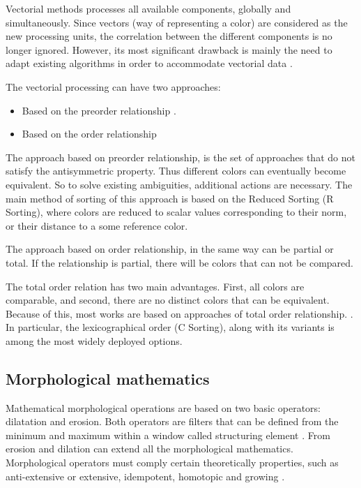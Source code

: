Vectorial methods processes all available components, globally and simultaneously.
Since vectors (way of representing a color) are considered as the new processing units, the correlation between the different components is no longer ignored. However, its most significant drawback is mainly the need to adapt existing algorithms in order to accommodate vectorial data \cite{aptoula2007comparative}.

The vectorial processing can have two approaches:
 
\begin{itemize}
    \item Based on the preorder relationship .
    \item Based on the order relationship 
\end{itemize}

The approach based on preorder relationship, is the set of approaches that do not satisfy the antisymmetric property.  Thus different colors can eventually become equivalent. So to solve existing ambiguities, additional actions are necessary. The main method of sorting of this approach is based on the Reduced Sorting (R Sorting), where colors are reduced to scalar values corresponding to their norm, or their distance to a some reference color. 

The approach based on order relationship, in the same way can be partial or total. If the relationship is partial, there will be colors that can not be compared. 

The total order relation has two main advantages. First, all colors are comparable, and second, there are no distinct colors that can be equivalent. Because of this, most works are based on approaches of total order relationship. \cite{aptoula2007comparative}. In particular, the lexicographical order (C Sorting), along with its variants is among the most widely deployed options.  

\subsection{Morphological mathematics}

Mathematical morphological operations are based on two basic operators: dilatation and erosion. Both operators are filters that can be defined from the minimum and maximum within a window called structuring element \cite{serra1986introduction}. From erosion and dilation can extend all the morphological mathematics. Morphological operators must comply certain theoretically properties, such as anti-extensive or extensive, idempotent, homotopic and growing \cite{serra1986introduction}.

